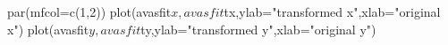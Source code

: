 \begin{Schunk}
\begin{Sinput}
 par(mfcol=c(1,2))
 plot(avasfit$x, avasfit$tx,ylab="transformed x",xlab="original x")
 plot(avasfit$y, avasfit$ty,ylab="transformed y",xlab="original y")
\end{Sinput}
\end{Schunk}
